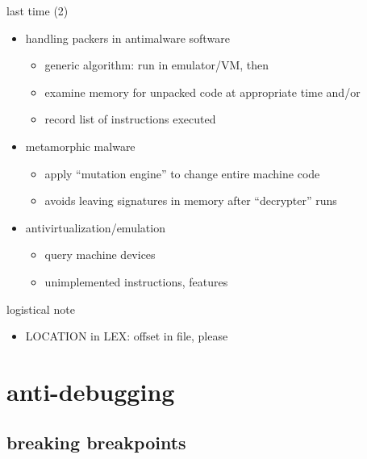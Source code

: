 \begin{frame}{last time (2)}
    \begin{itemize}
    \item handling packers in antimalware software
        \begin{itemize}
        \item generic algorithm: run in emulator/VM, then
        \item examine memory for unpacked code at appropriate time and/or
        \item record list of instructions executed
        \end{itemize}
    \item metamorphic malware
        \begin{itemize}
        \item apply ``mutation engine'' to change entire machine code
        \item avoids leaving signatures in memory after ``decrypter'' runs
        \end{itemize}
    \item antivirtualization/emulation
        \begin{itemize}
        \item query machine devices
        \item unimplemented instructions, features
        \end{itemize}
    \end{itemize}
\end{frame}

\begin{frame}{logistical note}
    \begin{itemize}
    \item LOCATION in LEX: offset in file, please
    \end{itemize}
\end{frame}

\usetikzlibrary{arrows.meta,positioning}

\section{anti-debugging}


\subsection{breaking breakpoints}



